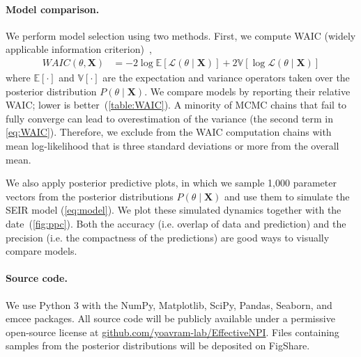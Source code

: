 \documentclass[12pt]{extarticle}
\let\vec\mathbf
\begin{document}
\paragraph*{Model comparison.}
We perform model selection using two methods.
First, we compute WAIC (widely applicable information criterion)~\citep{gelman2013bayesian},
\begin{equation} \label{eq:WAIC}
\begin{aligned}
WAIC(\theta, \vec{X}) &= -2\log\mathbb{E}[\mathcal{L}(\theta \mid \vec{X})] + 2\mathbb{V}[\log\mathcal{L}(\theta \mid \vec{X})]
\end{aligned}
\end{equation}
where $\mathbb{E}[\cdot]$ and $\mathbb{V}[\cdot]$ are the expectation and variance operators taken over the posterior distribution $P(\theta \mid \vec{X})$.
We compare models by reporting their relative WAIC; lower is better~(\autoref{table:WAIC}).
A minority of MCMC chains that fail to fully converge can lead to overestimation of the variance (the second term in \autoref{eq:WAIC}).
Therefore, we exclude from the WAIC computation chains with mean log-likelihood that is three standard deviations or more from the overall mean.

We also apply posterior predictive plots, in which we sample 1,000 parameter vectors from the posterior distributions $P(\theta \mid \vec{X})$ and use them to simulate the SEIR model (\autoref{eq:model}).
We plot these simulated dynamics together with the date~(\autoref{fig:ppc}).
Both the accuracy (i.e. overlap of data and prediction) and the precision (i.e. the compactness of the predictions) are good ways to visually compare models.



\paragraph*{Source code.} 
We use Python 3 with the NumPy, Matplotlib, SciPy, Pandas, Seaborn, and emcee packages.
All source code will be publicly available under a permissive open-source license at \href{http://github.com/yoavram-lab/EffectiveNPI}{github.com/yoavram-lab/EffectiveNPI}.
Files containing samples from the posterior distributions will be deposited on FigShare.
\end{document}
